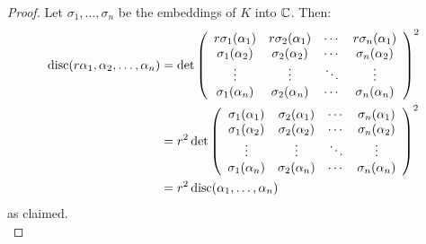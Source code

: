 \begin{proof}
	Let $\sigma_1,\ldots,\sigma_n$ be the embeddings of $K$ into $\mathbb{C}$. Then:
	\begin{align*}
	\operatorname{disc}(r\alpha_1,\alpha_2,\ldots,\alpha_n)
		&= \det\left(\begin{array}{cccc} r\sigma_1(\alpha_1) & r\sigma_2(\alpha_1) & \cdots & r\sigma_n(\alpha_1) \\ \sigma_1(\alpha_2) & \sigma_2(\alpha_2) & \cdots & \sigma_n(\alpha_2) \\ \vdots & \vdots & \ddots & \vdots \\ \sigma_1(\alpha_n) & \sigma_2(\alpha_n) & \cdots & \sigma_n(\alpha_n) \\ \end{array}\right)^2 \\
		&= r^2\det\left(\begin{array}{cccc} \sigma_1(\alpha_1) & \sigma_2(\alpha_1) & \cdots & \sigma_n(\alpha_1) \\ \sigma_1(\alpha_2) & \sigma_2(\alpha_2) & \cdots & \sigma_n(\alpha_2) \\ \vdots & \vdots & \ddots & \vdots \\ \sigma_1(\alpha_n) & \sigma_2(\alpha_n) & \cdots & \sigma_n(\alpha_n) \\ \end{array}\right)^2 \\
		&= r^2\operatorname{disc}(\alpha_1,\ldots,\alpha_n)
	\end{align*}
	as claimed. \\
	

\end{proof}
